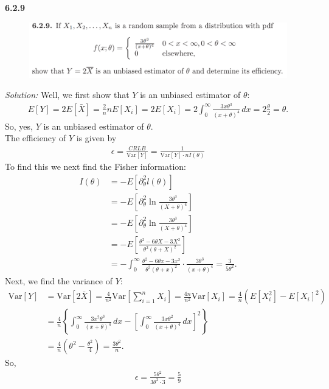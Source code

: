 \documentclass{book}
\theoremstyle{definition}
\newcommand{\p}{\partial}
\newcommand{\nn}{\nonumber}
\newcommand{\Var}{\text{Var}}
\newcommand{\f}[2]{\frac{#1}{#2}}
\newcommand{\lp}{\left(}
\newcommand{\rp}{\right)}
\newcommand{\lb}{\left[}
\newcommand{\rb}{\right]}
\newcommand{\lc}{\left\{}
\newcommand{\rc}{\right\}}
\begin{document}
\newpage
\noindent \textbf{6.2.9}
\begin{figure}[!htb]
	\centering
	\includegraphics[scale=0.25]{629}
\end{figure}


\noindent \textit{Solution:} Well, we first show that $Y$ is an unbiased estimator of $\theta$:
\begin{align}
E[Y] = 2E[\bar{X}] = \f{2}{n}nE[X_i] = 2E[X_i] = 2\int_0^\infty \f{3x\theta^3}{(x+\theta)^4}\,dx = 2\f{\theta}{2} = \theta.
\end{align}
So, yes, $Y$ is an unbiased estimator of $\theta$. \\

The efficiency of $Y$ is given by
\begin{align}
\epsilon = \f{CRLB}{\Var[Y]} = \f{1}{\Var[Y] \cdot nI(\theta)}
\end{align}
To find this we next find the Fisher information:
\begin{align}
I(\theta) &= -E\lb \p_\theta^2 l(\theta) \rb\nn\\
&=-E\lb \p_\theta^2 \ln \f{3\theta^3}{(X+\theta)^4} \rb\nn\\
&= -E\lb \p_\theta^2 \ln \f{3\theta^3}{(X+\theta)^4} \rb\nn\\
&= -E\lb \f{\theta^2 - 6\theta X - 3X^2}{\theta^2(\theta+X)^2}  \rb\nn\\
&= -\int^\infty_0 \f{\theta^2 - 6\theta x - 3x^2}{\theta^2(\theta+x)^2}\cdot \f{3\theta^3}{(x+\theta)^4} = \f{3}{5\theta^2}.
\end{align}
Next, we find the variance of $Y$:
\begin{align}
\Var[Y] &= \Var[2\bar{X}] = \f{4}{n^2}\Var\lb \sum^n_{i=1} X_i \rb = \f{4n}{n^2}\Var[X_i]= \f{4}{n}\lp E[X_i^2] - E[X_i]^2 \rp\nn\\
&= \f{4}{n} \lc \int_0^\infty \f{3x^2\theta^3}{(x+\theta)^4}\,dx - \lb \int^\infty_0 \f{3x\theta^2}{(x+\theta)^4}\,dx \rb^2\rc\nn\\
&= \f{4}{n}\lp \theta^2 - \f{\theta^2}{4} \rp = \f{3\theta^2}{n}.
\end{align}
So, 
\begin{align}
\epsilon = \f{5\theta^2}{3\theta^2 \cdot 3} = \boxed{\f{5}{9}}
\end{align}
\end{document}
